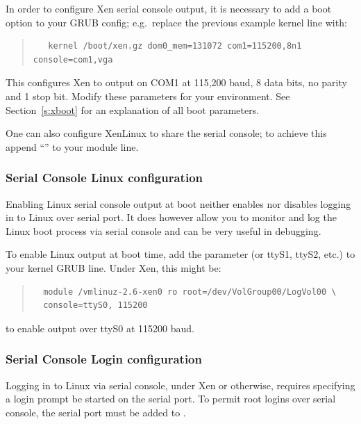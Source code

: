 \documentclass[11pt,twoside,final,openright]{report}
\begin{document}

In order to configure Xen serial console output, it is necessary to
add a boot option to your GRUB config; e.g.\ replace the previous
example kernel line with:
\begin{quote} {\small \begin{verbatim}
   kernel /boot/xen.gz dom0_mem=131072 com1=115200,8n1 console=com1,vga
\end{verbatim}}
\end{quote}

This configures Xen to output on COM1 at 115,200 baud, 8 data bits, no
parity and 1 stop bit. Modify these parameters for your environment.
See Section~\ref{s:xboot} for an explanation of all boot parameters.

One can also configure XenLinux to share the serial console; to achieve
this append ``'' to your module line.


\subsubsection{Serial Console Linux configuration}

Enabling Linux serial console output at boot neither enables nor
disables logging in to Linux over serial port.  It does however allow
you to monitor and log the Linux boot process via serial console and can be
very useful in debugging.

To enable Linux output at boot time, add the parameter
 (or ttyS1, ttyS2, etc.) to your kernel GRUB line.
Under Xen, this might be:
\begin{quote} 
{\footnotesize \begin{verbatim}
  module /vmlinuz-2.6-xen0 ro root=/dev/VolGroup00/LogVol00 \
  console=ttyS0, 115200
\end{verbatim}}
\end{quote}
to enable output over ttyS0 at 115200 baud.



\subsubsection{Serial Console Login configuration}

Logging in to Linux via serial console, under Xen or otherwise, requires
specifying a login prompt be started on the serial port.  To permit root
logins over serial console, the serial port must be added to
.
\end{document}
